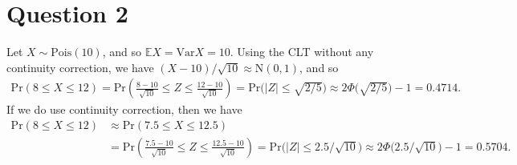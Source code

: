 \documentclass[10pt]{article}
\begin{document}
\section{Question 2} \noindent
Let \(X \sim \mathrm{Pois}(10)\), and so \(\mathbb{E}X = \mathrm{Var}X = 10\). Using the CLT without any continuity correction, we have 
\((X - 10)/\sqrt{10} \approx \mathrm{N}(0,1)\), and so 
\begin{align*}
    \mathrm{Pr}(8 \le X \le 12)
    = \mathrm{Pr} \left( \frac{8 - 10}{\sqrt{10}} \le Z \le \frac{12 - 10}{\sqrt{10}} \right)
    = \mathrm{Pr} \big( |Z| \le \sqrt{2/5} \big) 
    \approx 2 \Phi \big( \sqrt{2/5} \big) - 1 
    = 0.4714.
\end{align*}
If we do use continuity correction, then we have 
\begin{align*}
    \mathrm{Pr}(8 \le X \le 12)
    &\approx \mathrm{Pr}(7.5 \le X \le 12.5) \\
    &= \mathrm{Pr} \left( \frac{7.5 - 10}{\sqrt{10}} \le Z \le \frac{12.5 - 10}{\sqrt{10}} \right)
    = \mathrm{Pr} \big( |Z| \le 2.5/\sqrt{10} \big) 
    \approx 2 \Phi \big( 2.5/\sqrt{10} \big) - 1 
    = 0.5704.
\end{align*}

\end{document}
